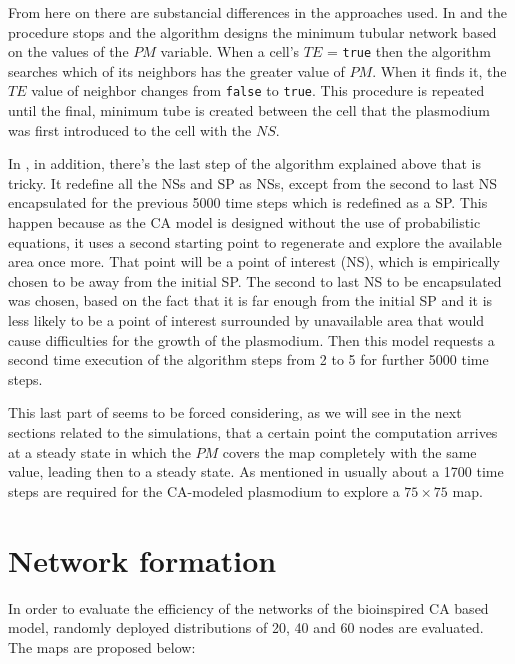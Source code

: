 \par
From here on there are substancial differences in the approaches used. In \cite{dourvas2016gpgpu} and \cite{tsompanas2015cellular} the procedure stops and the algorithm designs the minimum tubular network based on the values of the $PM$ variable. When a cell’s $TE$ = \texttt{true} then the algorithm searches which of its neighbors has the greater value of $PM$. When it finds it, the $TE$ value of neighbor changes from \texttt{false} to \texttt{true}. This procedure is repeated until the final, minimum tube is created between the cell that the plasmodium was first introduced to the cell with the $NS$. 

\par
In \cite{Tsompanas2016}, in addition, there's the last step of the algorithm explained above that is tricky. It redefine all the NSs and SP as NSs, except from the second to last NS encapsulated for the previous 5000 time steps which is redefined as a SP. This happen because as the CA model is designed without the use of probabilistic equations, it uses a second starting point to regenerate and explore the available area once more. That point will be a point of interest (NS), which is empirically chosen to be away from the initial SP. The second to last NS to be encapsulated was chosen, based on the fact that it is far enough from the initial SP and it is less likely to be a point of interest surrounded by unavailable area that would cause difficulties for the growth of the plasmodium. Then this model requests a second time execution of the algorithm steps from 2 to 5 for further 5000 time steps.

\par
This last part of seems to be forced considering, as we will see in the next sections related to the simulations, that a certain point the computation arrives at a steady state in which the $PM$ covers the map completely with the same value, leading then to a steady state. As mentioned in \cite{dourvas2016gpgpu} usually about a 1700 time steps are required for the CA-modeled plasmodium to explore a $75 \times 75$ map.

\section{Network formation}
\label{network_formation_5}
In order to evaluate the efficiency of the networks of the bioinspired CA based model, randomly deployed distributions of 20, 40 and 60 nodes are evaluated. The maps are proposed below:

